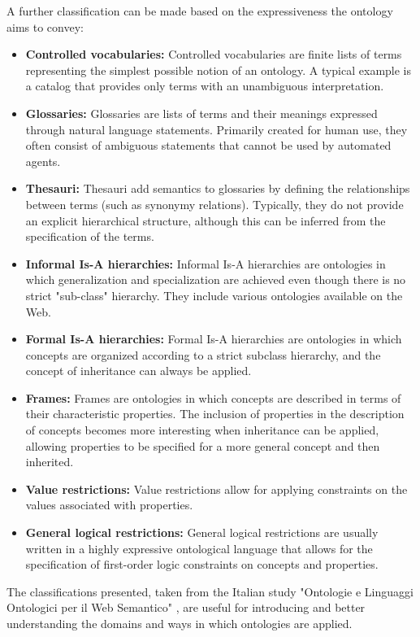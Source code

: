 A further classification can be made based on the expressiveness the ontology aims to convey:
\begin{itemize}
    \item \textbf{Controlled vocabularies:} Controlled vocabularies are finite lists of terms representing the simplest possible notion of an ontology. A typical example is a catalog that provides only terms with an unambiguous interpretation.

    \item \textbf{Glossaries:} Glossaries are lists of terms and their meanings expressed through natural language statements. Primarily created for human use, they often consist of ambiguous statements that cannot be used by automated agents.

    \item \textbf{Thesauri:} Thesauri add semantics to glossaries by defining the relationships between terms (such as synonymy relations). Typically, they do not provide an explicit hierarchical structure, although this can be inferred from the specification of the terms.

    \item \textbf{Informal Is-A hierarchies:} Informal Is-A hierarchies are ontologies in which generalization and specialization are achieved even though there is no strict "sub-class" hierarchy. They include various ontologies available on the Web.

    \item \textbf{Formal Is-A hierarchies:} Formal Is-A hierarchies are ontologies in which concepts are organized according to a strict subclass hierarchy, and the concept of inheritance can always be applied.

    \item \textbf{Frames:} Frames are ontologies in which concepts are described in terms of their characteristic properties. The inclusion of properties in the description of concepts becomes more interesting when inheritance can be applied, allowing properties to be specified for a more general concept and then inherited.

    \item \textbf{Value restrictions:} Value restrictions allow for applying constraints on the values associated with properties.

    \item \textbf{General logical restrictions:} General logical restrictions are usually written in a highly expressive ontological language that allows for the specification of first-order logic constraints on concepts and properties.
    
\end{itemize}
The classifications presented, taken from the Italian study "Ontologie e Linguaggi Ontologici per il Web Semantico" \cite{canfora2004ontologie}, are useful for introducing and better understanding the domains and ways in which ontologies are applied.

